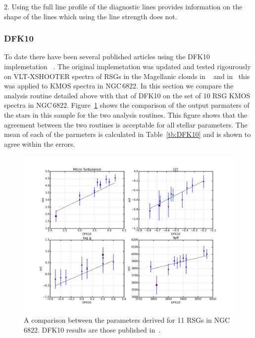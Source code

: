 \documentclass[12pt]{article}
\begin{document}
2. Using the full line profile of the diagnostic lines provides information on the shape of the lines which using the line strength does not.

\subsubsection{DFK10} %
\label{sub:dfk10}
To date there have been several published articles using the DFK10 implemetation
~\citep{2010MNRAS.407.1203D,2015ApJ...803...14P,2015ApJ...806...21D}.
The original implemetation was updated and tested rigourously on VLT-XSHOOTER spectra of RSGs in the Magellanic clouds in
~\cite{2015ApJ...806...21D} and in~\cite{2015ApJ...803...14P} this was applied to KMOS spectra in NGC\,6822.
In this section we compare the analysis routine detailed above with that of DFK10 on the set of 10 RSG KMOS spectra in NGC\,6822.
Figure~\ref{fig:n6822DFK} shows the comparison of the output parmaters of the stars in this sample for the two analysis routines.
This figure shows that the agreement between the two routines is acceptable for all stellar parameters.
The mean of each of the parmeters is calculated in Table~\ref{tb:DFK10} and is shown to agree within the errors.

\begin{figure}
 \centering
 \includegraphics[width=\textwidth]{compare-DFK10}
 \caption[NGC\,6822 DFK10]{
A comparison between the parameters derived for 11 RSGs in NGC\,6822.
DFK10 results are those published in~\cite{2015ApJ...803...14P}.\label{fig:n6822DFK}
         }
\end{figure}
\end{document}

